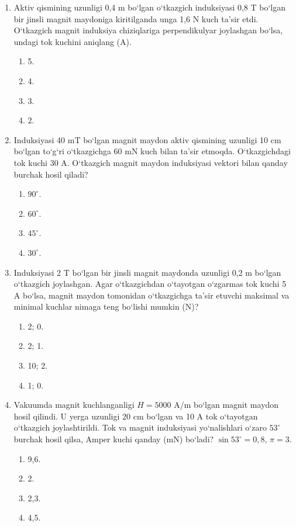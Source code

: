 \begin{enumerate}
\item Aktiv qismining uzunligi 0,4 m bo‘lgan o‘tkazgich induksiyasi 0,8 T bo‘lgan bir jinsli magnit maydoniga kiritilganda unga 1,6 N kuch ta’sir etdi. O‘tkazgich magnit induksiya chiziqlariga perpendikulyar joylashgan bo‘lsa, undagi tok kuchini aniqlang (A).
\begin{enumerate}[label=\Alph*)]
\item 5.
\item 4.
\item 3.
\item 2.
\end{enumerate}

\item Induksiyasi 40 mT bo‘lgan magnit maydon aktiv qismining uzunligi 10 cm bo‘lgan to‘g‘ri o‘tkazgichga 60 mN kuch bilan ta’sir etmoqda. O‘tkazgichdagi tok kuchi 30 A. O‘tkazgich magnit maydon induksiyasi vektori bilan qanday burchak hosil qiladi?
\begin{enumerate}[label=\Alph*)]
\item $90^\circ$.
\item $60^\circ$.
\item $45^\circ$.
\item $30^\circ$.
\end{enumerate}

\setcounter{enumi}{5}
\item Induksiyasi 2 T bo‘lgan bir jinsli magnit maydonda uzunligi 0,2 m bo‘lgan o‘tkazgich joylashgan. Agar o‘tkazgichdan o‘tayotgan o‘zgarmas tok kuchi 5 A bo‘lsa, magnit maydon tomonidan o‘tkazgichga ta’sir etuvchi maksimal va minimal kuchlar nimaga teng bo‘lishi mumkin (N)?
\begin{enumerate}[label=\Alph*)]
\item 2; 0.
\item 2; 1.
\item 10; 2.
\item 1; 0.
\end{enumerate}

\item Vakuumda magnit kuchlanganligi $H=5000$ A/m bo‘lgan magnit maydon hosil qilindi. U yerga uzunligi 20 cm bo‘lgan va 10 A tok o‘tayotgan o‘tkazgich joylashtirildi. Tok va magnit induksiyasi yo‘nalishlari o‘zaro $53^\circ$ burchak hosil qilsa, Amper kuchi qanday (mN) bo‘ladi? $\sin 53^\circ = 0,8$, $\pi=3$.
\begin{enumerate}[label=\Alph*)]
\item 9,6.
\item 2.
\item 2,3.
\item 4,5.
\end{enumerate}


\end{enumerate}
